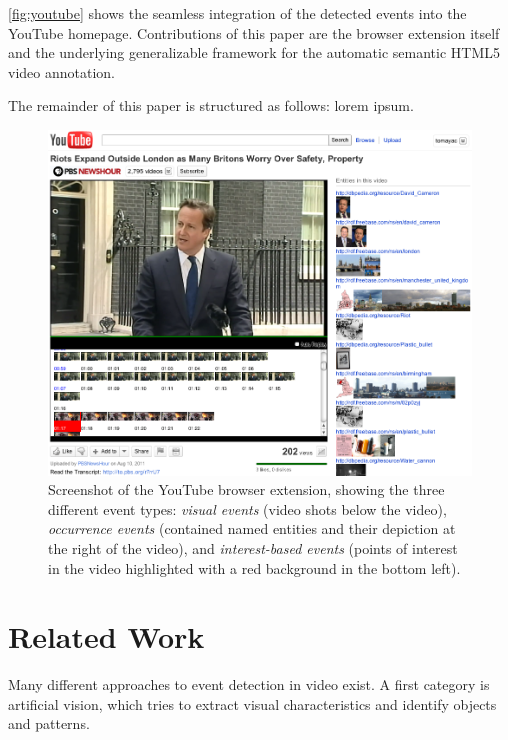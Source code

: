 \documentclass[runningheads,a4paper]{llncs}
\begin{document}
\autoref{fig:youtube} shows the seamless integration of the detected events into the YouTube homepage. Contributions of this paper are the browser extension itself and the underlying generalizable framework for the automatic semantic HTML5 video annotation.

The remainder of this paper is structured as follows: lorem ipsum.

\begin{figure}[htb!]
\begin{center}
   \includegraphics[width=0.8\linewidth]{./resources/youtube}
\end{center}
   \caption{Screenshot of the YouTube browser extension, showing the three different event types: \emph{visual events} (video shots below the video), \emph{occurrence events} (contained named entities and their depiction at the right of the video), and \emph{interest-based events} (points of interest in the video highlighted with a red background in the bottom left).}
\label{fig:youtube}
\end{figure}


\section{Related Work} \label{sec:related-work}
Many different approaches to event detection in video exist.
A first category is artificial vision, which tries to extract visual characteristics and identify objects and patterns.
\end{document}
